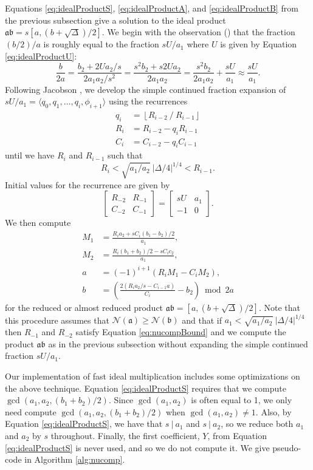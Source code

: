 \documentclass{ucalgthes1}
\theoremstyle{definition}
\newcommand{\matrixtt}[4]{\left[ \begin{array}{rr} #1 & #2 \\ #3 & #4 \end{array} \right]}
\newcommand{\floor}[1]{\left\lfloor #1 \right\rfloor}
\begin{document}
Equations \ref{eq:idealProductS}, \ref{eq:idealProductA}, and \ref{eq:idealProductB} from the previous subsection give a solution to the ideal product $\mathfrak a \mathfrak b = s[a, (b+\sqrt\Delta)/2]$.  We begin with the observation (\cite[p.119]{Jacobson2009}) that the fraction $(b/2)/a$ is roughly equal to the fraction $sU / a_1$ where $U$ is given by Equation \ref{eq:idealProductU}:
\[
	\frac{b}{2a} = \frac{b_2 + 2Ua_2/s}{2a_1a_2/s^2} 
	= \frac{s^2 b_2+s2Ua_2}{2a_1a_2}
	= \frac{s^2b_2}{2a_1a_2} + \frac{sU}{a_1}
	\approx \frac{sU}{a_1}.
\]
Following Jacobson \cite[pp.120-121]{Jacobson2009}, we develop the simple continued fraction expansion of $sU/a_1 = \langle q_0, q_1, \dots, q_i, \phi_{i+1} \rangle$ using the recurrences
\begin{align*}
	q_i &= \floor{R_{i-2} ~/~ R_{i-1}} \\
	R_i &= R_{i-2} - q_i R_{i-1} \\
	C_i &= C_{i-2} - q_i C_{i-1}
\end{align*}
until we have $R_i$ and $R_{i-1}$ such that
\begin{equation}
\label{eq:nucompBound}
	R_i < \sqrt{a_1/a_2} ~ |\Delta/4|^{1/4} < R_{i-1}.
\end{equation}
Initial values for the recurrence are given by
\[
	\matrixtt{R_{-2}}{R_{-1}}{C_{-2}}{C_{-1}} = \matrixtt{sU}{a_1}{-1}{0}.
\]
We then compute
\begin{align*}
	M_1 &= \frac{R_i a_2 + sC_i(b_1-b_2)/2}{a_1}, \\
	M_2 &= \frac{R_i (b_1+b_2)/2 - s C_i c_2}{a_1}, \\
	a &= (-1)^{i+1} (R_i M_1  - C_i M_2), \\
	b &= \left( \frac{2(R_i a_2 /s - C_{i-1} a)}{C_i} - b_2 \right) \bmod 2a
\end{align*}
for the reduced or almost reduced product $\mathfrak a \mathfrak b = [a, (b + \sqrt\Delta)/2]$.  Note that this procedure assumes that $\mathcal N(\mathfrak a) \ge \mathcal N(\mathfrak b)$ and that if $a_1 < \sqrt{a_1/a_2} ~ |\Delta/4|^{1/4}$ then $R_{-1}$ and $R_{-2}$ satisfy Equation \ref{eq:nucompBound} and we compute the product $\mathfrak a \mathfrak b$ as in the previous subsection without expanding the simple continued fraction $sU/a_1$.

Our implementation of fast ideal multiplication includes some optimizations on the above technique.  Equation \ref{eq:idealProductS} requires that we compute $\gcd(a_1, a_2, (b_1 + b_2)/2)$. Since $\gcd(a_1, a_2)$ is often equal to 1, we only need compute $\gcd(a_1, a_2, (b_1 + b_2)/2)$ when $\gcd(a_1, a_2) \neq 1$. Also, by Equation \ref{eq:idealProductS}, we have that $s ~|~ a_1$ and $s ~|~ a_2$, so we reduce both $a_1$ and $a_2$ by $s$ throughout. Finally, the first coefficient, $Y$, from Equation \ref{eq:idealProductS} is never used, and so we do not compute it. We give pseudo-code in Algorithm \ref{alg:nucomp}. 
\end{document}
